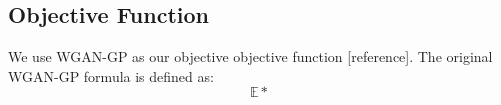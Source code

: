 \subsection{Objective Function}
We use WGAN-GP as our objective objective function [reference]. The original WGAN-GP formula is defined as:
\begin{equation}
\mathbb{E*}
\end{equation}